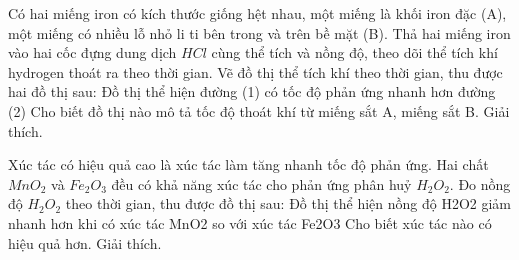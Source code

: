 \begin{bt}
	Có hai miếng iron có kích thước giống hệt nhau, một miếng là khối iron đặc (A), một miếng có nhiều lỗ nhỏ li ti bên trong và trên bề mặt (B). Thả hai miếng iron vào hai cốc đựng dung dịch $HCl$ cùng thể tích và nồng độ, theo dõi thể tích khí hydrogen thoát ra theo thời gian. Vẽ đồ thị thể tích khí theo thời gian, thu được hai đồ thị sau: {Đồ thị thể hiện đường (1) có tốc độ phản ứng nhanh hơn đường (2)}
	Cho biết đồ thị nào mô tả tốc độ thoát khí từ miếng sắt A, miếng sắt B. Giải thích.
\end{bt}

\begin{bt}
	Xúc tác có hiệu quả cao là xúc tác làm tăng nhanh tốc độ phản ứng. Hai chất $MnO_2$ và $Fe_2O_3$ đều có khả năng xúc tác cho phản ứng phân huỷ $H_2O_2$.
	Đo nồng độ $H_2O_2$ theo thời gian, thu được đồ thị sau: {Đồ thị thể hiện nồng độ H2O2 giảm nhanh hơn khi có xúc tác MnO2 so với xúc tác Fe2O3}
	Cho biết xúc tác nào có hiệu quả hơn. Giải thích.
\end{bt}

